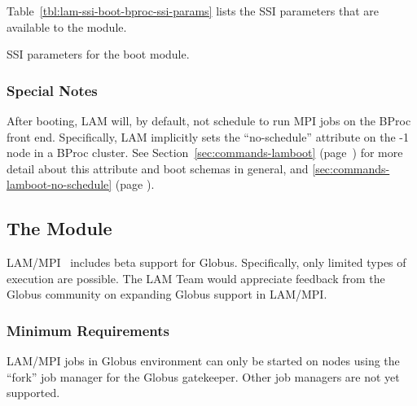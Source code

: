 Table~\ref{tbl:lam-ssi-boot-bproc-ssi-params} lists the SSI parameters
that are available to the  module.

\begin{table}[htbp]
  \begin{ssiparamtb}
%
  \end{ssiparamtb}
  \caption{SSI parameters for the  boot module.}
  \label{tbl:lam-ssi-boot-bproc-ssi-params}
\end{table}


\subsubsection{Special Notes}

After booting, LAM will, by default, not schedule to run MPI jobs on
the BProc front end.  Specifically, LAM implicitly sets the
``no-schedule'' attribute on the -1 node in a BProc cluster.  See
Section~\ref{sec:commands-lamboot}
(page~\pageref{sec:commands-lamboot}) for more detail about this
attribute and boot schemas in general, and
\ref{sec:commands-lamboot-no-schedule} (page 
\pageref{sec:commands-lamboot-no-schedule}).


\subsection{The  Module}

LAM/MPI \lamversion\ includes beta support for Globus.  Specifically,
only limited types of execution are possible.  The LAM Team would
appreciate feedback from the Globus community on expanding Globus
support in LAM/MPI.


\subsubsection{Minimum Requirements}

LAM/MPI jobs in Globus environment can only be started on nodes using
the ``fork'' job manager for the Globus gatekeeper.  Other job
managers are not yet supported.


